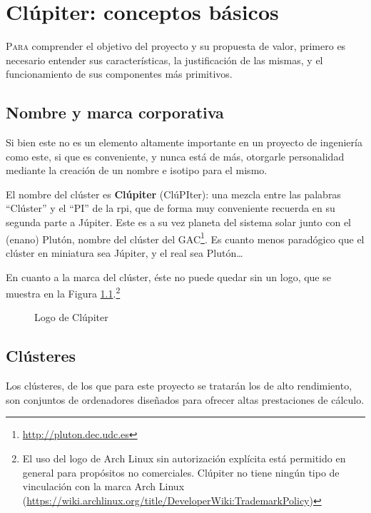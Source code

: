 \chapter{Clúpiter: conceptos básicos}
\label{chap:conceptos_basicos}

\lettrine{P}{ara} comprender el objetivo del proyecto y su propuesta de valor, primero es necesario entender sus características, la justificación de las mismas, y el funcionamiento de sus componentes más primitivos.

\section{Nombre y marca corporativa}
Si bien este no es un elemento altamente importante en un proyecto de ingeniería como este, si que es conveniente, y nunca está de más, otorgarle personalidad mediante la creación de un nombre e isotipo para el mismo.

El nombre del clúster es \textbf{Clúpiter} (ClúPIter): una mezcla entre las palabras ``Clúster'' y el ``PI'' de la \acrlong{rpi}, que de forma muy conveniente recuerda en su segunda parte a Júpiter. Este es a su vez planeta del sistema solar junto con el (enano) Plutón, nombre del clúster del GAC\footnote{\url{http://pluton.dec.udc.es}}. Es cuanto menos paradógico que el clúster en miniatura sea Júpiter, y el real sea Plutón\dots

En cuanto a la marca del clúster, éste no puede quedar sin un logo, que se muestra en la Figura \ref{fig:clupiter_logo}.\footnote{El uso del logo de Arch Linux sin autorización explícita está permitido en general para propósitos no comerciales. Clúpiter no tiene ningún tipo de vinculación con la marca Arch Linux (\url{https://wiki.archlinux.org/title/DeveloperWiki:TrademarkPolicy})}

\begin{figure}[h!]
  \centering
  \vspace*{0.5cm}
  \def\svgwidth{0.50\textwidth}
  
  \caption{Logo de Clúpiter}
  \label{fig:clupiter_logo}
\end{figure}

\section{Clústeres}
Los clústeres, de los que para este proyecto se tratarán los de alto rendimiento, son conjuntos de ordenadores diseñados para ofrecer altas prestaciones de cálculo.

